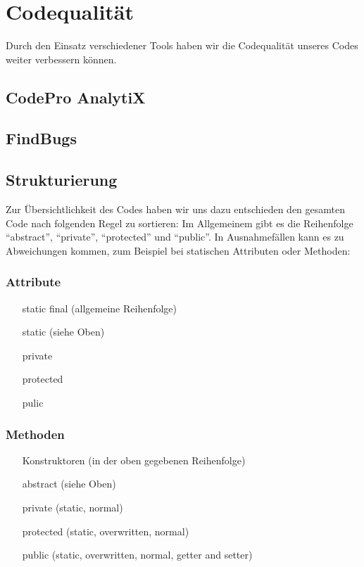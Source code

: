 \documentclass[parskip=full]{scrreprt}
\begin{document}
\chapter{Codequalität}

Durch den Einsatz verschiedener Tools haben wir die Codequalität unseres Codes weiter verbessern können.

\section{CodePro AnalytiX}



\section{FindBugs}


\section{Strukturierung}
Zur Übersichtlichkeit des Codes haben wir uns dazu entschieden den gesamten Code nach folgenden Regel zu sortieren: \newline
Im Allgemeinem gibt es die Reihenfolge "`abstract"', "`private"', "`protected"' und "`public"'. In Ausnahmefällen kann es zu Abweichungen kommen, zum Beispiel bei statischen Attributen oder Methoden:
\subsection{Attribute}
\begin{enumerate}
	\item[static final] (allgemeine Reihenfolge) 
	\item[static] (siehe Oben)
	\item[private]
	\item[protected]
	\item[pulic]
\end{enumerate}
\subsection{Methoden}
\begin{enumerate}
	\item[Konstruktoren] (in der oben gegebenen Reihenfolge)
	\item[abstract] (siehe Oben)
	\item[private] (static, normal)
	\item[protected] (static, overwritten, normal)
	\item[public] (static, overwritten, normal, getter and setter)
\end{enumerate}
\end{document}
